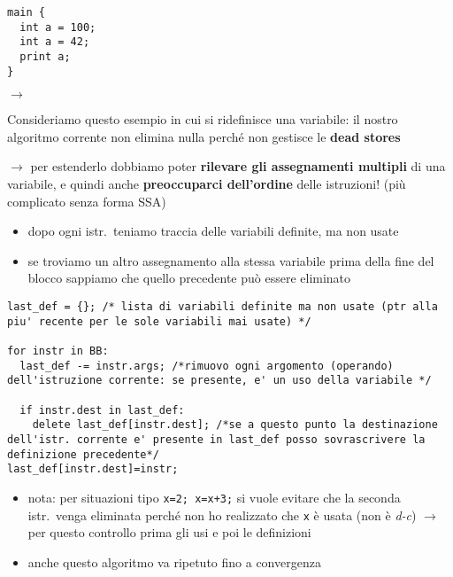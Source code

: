\noindent\begin{minipage}[c]{.3\textwidth}
  \begin{lstlisting}
main {
  int a = 100;
  int a = 42;
  print a;
}\end{lstlisting}
\end{minipage}\hfill $\rightarrow$ \hfill
\begin{minipage}[c]{.62\textwidth}
  Consideriamo questo esempio in cui si ridefinisce una variabile: il nostro algoritmo corrente non elimina nulla perch\'e non gestisce le \textbf{dead stores}
\end{minipage}

\noindent $\rightarrow$ per estenderlo dobbiamo poter \textbf{rilevare gli assegnamenti multipli} di una variabile, e quindi anche \textbf{preoccuparci dell'ordine} delle istruzioni! (pi\`u complicato senza forma SSA)

\begin{itemize}
  \item dopo ogni istr.~teniamo traccia delle variabili definite, ma non usate
  \item se troviamo un altro assegnamento alla stessa variabile prima della fine del blocco sappiamo che quello precedente pu\`o essere eliminato
\end{itemize}

\begin{lstlisting}
last_def = {}; /* lista di variabili definite ma non usate (ptr alla piu' recente per le sole variabili mai usate) */

for instr in BB:
  last_def -= instr.args; /*rimuovo ogni argomento (operando) dell'istruzione corrente: se presente, e' un uso della variabile */

  if instr.dest in last_def:
    delete last_def[instr.dest]; /*se a questo punto la destinazione dell'istr. corrente e' presente in last_def posso sovrascrivere la definizione precedente*/
last_def[instr.dest]=instr;\end{lstlisting}

\begin{itemize}
  \item nota: per situazioni tipo \lstinline|x=2; x=x+3;| si vuole evitare che la seconda istr.~venga eliminata perch\'e non ho realizzato che \lstinline|x| \`e usata (non \`e \textit{d-c}) $\rightarrow$ per questo controllo prima gli usi e poi le definizioni
  \item anche questo algoritmo va ripetuto fino a convergenza
\end{itemize}


